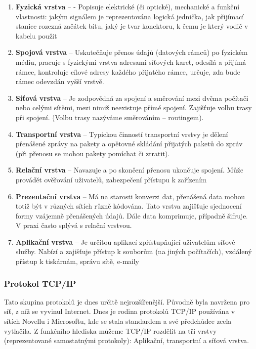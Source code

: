 \begin{enumerate}
\item \textbf{Fyzická vrstva} -- - Popisuje elektrické (či optické), mechanické a funkční vlastnosti: jakým signálem je reprezentována logická jednička, jak přijímací stanice rozezná začátek bitu, jaký je tvar konektoru, k čemu je který vodič v kabelu použit
\item \textbf{Spojová vrstva} -- Uskutečňuje přenos údajů (datových rámců) po fyzickém médiu, pracuje s fyzickými vrstva adresami síťových karet, odesílá a přijímá rámce, kontroluje cílové adresy každého přijatého rámce, určuje, zda bude rámec odevzdán vyšší vrstvě.
\item \textbf{Síťová vrstva} -- Je zodpovědná za spojení a směrování mezi dvěma počítači nebo celými sítěmi, mezi nimiž neexistuje přímé spojení. Zajišťuje volbu trasy při spojení. (Volbu trasy nazýváme směrováním – routingem).
\item \textbf{Transportní vrstva} -- Typickou činností transportní vrstvy je dělení přenášené zprávy na pakety a opětovné skládání přijatých paketů do zpráv (při přenosu se mohou pakety pomíchat či ztratit).
\item \textbf{Relační vrstva} -- Navazuje a po skončení přenosu ukončuje spojení. Může provádět ověřování uživatelů, zabezpečení přístupu k zařízením
\item \textbf{Prezentační vrstva} -- Má na starosti konverzi dat, přenášená data mohou totiž být v různých sítích různě kódována. Tato vrstva zajišťuje sjednocení formy vzájemně přenášených údajů. Dále data komprimuje, případně šifruje. V praxi často splývá s relační vrstvou.
\item \textbf{Aplikační vrstva} -- Je určitou aplikací zpřístupňující uživatelům síťové služby. Nabízí a zajišťuje přístup k souborům (na jiných počítačích), vzdálený přístup k tiskárnám, správu sítě, e-maily
\end{enumerate}

\subsubsection{Protokol TCP/IP}
Tato skupina protokolů je dnes určitě nejrozšířenější. Původně byla navržena pro síť, z níž se vyvinul Internet. Dnes je rodina protokolů TCP/IP používána v sítích Novellu i Microsoftu, kde se stala standardem a své předchůdce zcela vytlačila.
Z funkčního hlediska můžeme TCP/IP rozdělit na tři vrstvy (reprezentované samostatnými protokoly): Aplikační, transportní a síťová vrstva.

